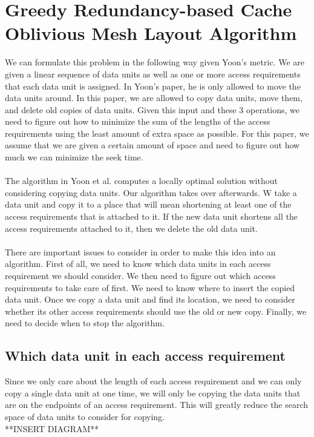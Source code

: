 \documentclass[conference]{acmsiggraph}
\begin{document}
\section{Greedy Redundancy-based Cache Oblivious Mesh Layout Algorithm}

We can formulate this problem in the following way given Yoon's metric. We are given a linear sequence of data units as well as one or more access requirements that each data unit is assigned. In Yoon's paper, he is only allowed to move the data units around. In this paper, we are allowed to copy data units, move them, and delete old copies of data units. Given this input and these 3 operations, we need to figure out how to minimize the sum of the lengths of the access requirements using the least amount of extra space as possible. For this paper, we assume that we are given a certain amount of space and need to figure out how much we can minimize the seek time.\\
\\
The algorithm in Yoon et al. computes a locally optimal solution without considering copying data units. Our algorithm takes over afterwards. W take a data unit and copy it to a place that will mean shortening at least one of the access requirements that is attached to it. If the new data unit shortens all the access requirements attached to it, then we delete the old data unit. \\
\\
There are important issues to consider in order to make this idea into an algorithm. First of all, we need to know which data units in each access requirement we should consider. We then need to figure out which access requirements to take care of first. We need to know where to insert the copied data unit. Once we copy a data unit and find its location, we need to consider whether its other access requirements should use the old or new copy. Finally, we need to decide when to stop the algorithm.  

\subsection{Which data unit in each access requirement}

Since we only care about the length of each access requirement and we can only copy a single data unit at one time, we will only be copying the data units that are on the endpoints of an access requirement. This will greatly reduce the search space of data units to consider for copying. \\
**INSERT DIAGRAM**
\end{document}
